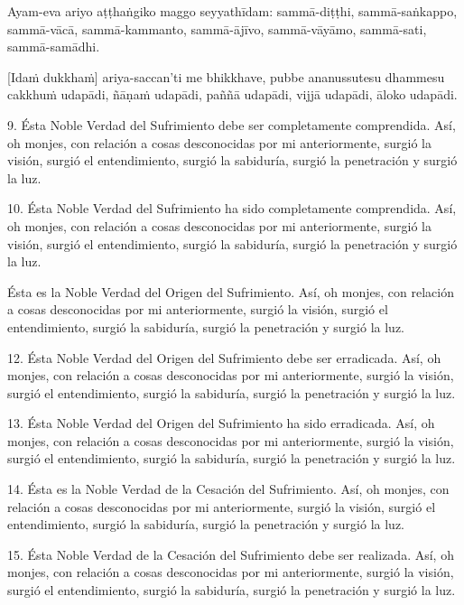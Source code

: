 Ayam-eva ariyo aṭṭhaṅgiko maggo seyyathīdam: sammā-diṭṭhi,
sammā-saṅkappo, sammā-vācā, sammā-kammanto, sammā-ājīvo, sammā-vāyāmo,
sammā-sati, sammā-samādhi.

\enlargethispage{\baselineskip}

[Idaṁ dukkhaṁ] ariya-saccan'ti me bhikkhave, pubbe ananussutesu dhammesu
cakkhuṁ udapādi, ñāṇaṁ udapādi, paññā udapādi, vijjā udapādi, āloko
udapādi.

\clearpage

\englishText
\markboth{\englishTitle}{\rightmark}

9. Ésta Noble Verdad del Sufrimiento debe ser completamente comprendida. Así, oh monjes, con relación a cosas desconocidas por mi anteriormente, surgió la visión, surgió el entendimiento, surgió la sabiduría, surgió la penetración y surgió la luz.

10. Ésta Noble Verdad del Sufrimiento ha sido completamente comprendida. Así, oh monjes, con relación a cosas desconocidas por mi anteriormente, surgió la visión, surgió el entendimiento, surgió la sabiduría, surgió la penetración y surgió la luz.

Ésta es la Noble Verdad del Origen del Sufrimiento. Así, oh monjes, con relación a cosas desconocidas por mi anteriormente, surgió la visión, surgió el entendimiento, surgió la sabiduría, surgió la penetración y surgió la luz.

12. Ésta Noble Verdad del Origen del Sufrimiento debe ser erradicada. Así, oh monjes, con relación a cosas desconocidas por mi anteriormente, surgió la visión, surgió el entendimiento, surgió la sabiduría, surgió la penetración y surgió la luz.

13. Ésta Noble Verdad del Origen del Sufrimiento ha sido erradicada. Así, oh monjes, con relación a cosas desconocidas por mi anteriormente, surgió la visión, surgió el entendimiento, surgió la sabiduría, surgió la penetración y surgió la luz.

14. Ésta es la Noble Verdad de la Cesación del Sufrimiento. Así, oh monjes, con relación a cosas desconocidas por mi anteriormente, surgió la visión, surgió el entendimiento, surgió la sabiduría, surgió la penetración y surgió la luz.

15. Ésta Noble Verdad de la Cesación del Sufrimiento debe ser realizada. Así, oh monjes, con relación a cosas desconocidas por mi anteriormente, surgió la visión, surgió el entendimiento, surgió la sabiduría, surgió la penetración y surgió la luz.

\enlargethispage*{2\baselineskip}

